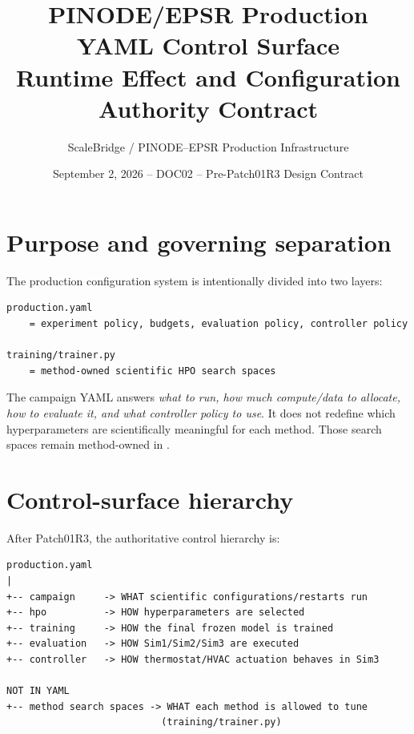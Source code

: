 \documentclass[10pt]{article}
\title{PINODE/EPSR Production YAML Control Surface\\Runtime Effect and Configuration Authority Contract}
\author{ScaleBridge / PINODE--EPSR Production Infrastructure}
\date{September 2, 2026 -- DOC02 -- Pre-Patch01R3 Design Contract}
\begin{document}
\maketitle

\begin{center}
\end{center}

\tableofcontents
\newpage

\section{Purpose and governing separation}
The production configuration system is intentionally divided into two layers:

\begin{verbatim}
production.yaml
    = experiment policy, budgets, evaluation policy, controller policy

training/trainer.py
    = method-owned scientific HPO search spaces
\end{verbatim}

The campaign YAML answers \emph{what to run, how much compute/data to allocate, how to evaluate it, and what controller policy to use}. It does not redefine which hyperparameters are scientifically meaningful for each method. Those search spaces remain method-owned in .

\section{Control-surface hierarchy}
After Patch01R3, the authoritative control hierarchy is:

\begin{verbatim}
production.yaml
|
+-- campaign     -> WHAT scientific configurations/restarts run
+-- hpo          -> HOW hyperparameters are selected
+-- training     -> HOW the final frozen model is trained
+-- evaluation   -> HOW Sim1/Sim2/Sim3 are executed
+-- controller   -> HOW thermostat/HVAC actuation behaves in Sim3

NOT IN YAML
+-- method search spaces -> WHAT each method is allowed to tune
                           (training/trainer.py)
\end{verbatim}
\end{document}
